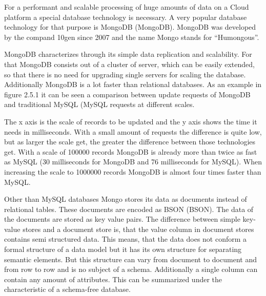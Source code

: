 For a performant and scalable processing of huge amounts of data on a Cloud platform a special database technology is necessary. A very popular database technology for that purpose is \acs{MongoDB} (\acl{MongoDB}). MongoDB was developed by the compand 10gen since 2007 and the name Mongo stands for ``Humongous''. 


MongoDB characterizes through its simple data replication and scalability. For that MongoDB consists out of a cluster of server, which can be easily extended, so that there is no need for upgrading single servers for scaling the database. Additionally MongoDB is a lot faster than relational databases. As an example in figure 2.5.1 it can be seen a comparison between update requests of MongoDB and traditional \acs{MySQL} (\acl{MySQL} requests at different scales.


The x axis is the scale of records to be updated and the y axis shows the time it needs in milliseconds. With a small amount of requests the difference is quite low, but as larger the scale get, the greater the difference between those technologies get. With a scale of 100000 records MongoDB is already more than twice as fast as MySQL (30 milliseconds for MongoDB and 76 milliseconds for MySQL). When increasing the scale to 1000000 records MongoDB is almost four times faster than MySQL.

Other than MySQL databases Mongo stores its data as documents instead of relational tables. These documents are encoded as \acs{BSON} (\acl{BSON}). The data of the documents are stored as key value pairs. The difference between simple key-value stores and a document store is, that the value column in document stores contains semi structured data. This means, that the data does not conform a formal structure of a data model but it has its own structure for separating semantic elements. But this structure can vary from document to document and from row to row and is no subject of a schema. Additionally a single column can contain any amount of attributes. This can be summarized under the characteristic of a schema-free database.

